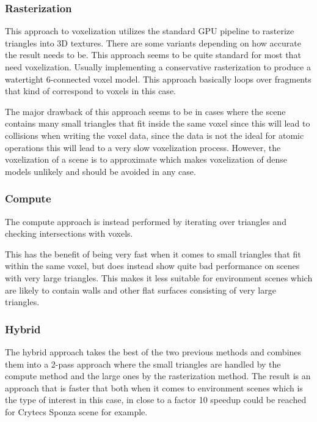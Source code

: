 \documentclass[a4paper, 12pt]{article}
\begin{document}
\subsubsection{Rasterization}

This approach to voxelization utilizes the standard GPU pipeline to rasterize triangles into 3D textures. There are some variants depending on how accurate the result needs to be. This approach seems to be quite standard for most that need voxelization. Usually implementing a conservative rasterization to produce a watertight 6-connected voxel model. This approach basically loops over fragments that kind of correspond to voxels in this case.

The major drawback of this approach seems to be in cases where the scene contains many small triangles that fit inside the same voxel since this will lead to collisions when writing the voxel data, since the data is not the ideal for atomic operations this will lead to a very slow voxelization process. However, the voxelization of a scene is to approximate which makes voxelization of dense models unlikely and should be avoided in any case. 

\subsubsection{Compute}

The compute approach is instead performed by iterating over triangles and checking intersections with voxels.

This has the benefit of being very fast when it comes to small triangles that fit within the same voxel, but does instead show quite bad performance on scenes with very large triangles. This makes it less suitable for environment scenes which are likely to contain walls and other flat surfaces consisting of very large triangles. 

\subsubsection{Hybrid}

The hybrid approach takes the best of the two previous methods and combines them into a 2-pass approach where the small triangles are handled by the compute method and the large ones by the rasterization method. The result is an approach that is faster that both when it comes to environment scenes which is the type of interest in this case, in \cite{phdthesis} close to a factor 10 speedup could be reached for Crytecs Sponza scene for example.
\end{document}
